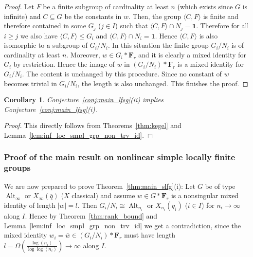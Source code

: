 \documentclass[a4paper,12pt]{amsproc}
\newcommand{\norm}[1]{\left\lvert#1\right\rvert}%
\DeclareMathOperator{\Alt}{Alt}%
\theoremstyle{plain}
\newtheorem{corollary}[definition]{Corollary}
\theoremstyle{definition}
\begin{document}
\begin{proof} 
Let $F$ be a finite subgroup of cardinality at least $n$ (which exists since $G$ is infinite) and $C\subseteq G$ be the constants in $w$. Then, the group $\langle C,F\rangle$ is finite and therefore contained in some $G_j$ ($j\in I$) such that $\langle C,F\rangle\cap N_j=\mathbf{1}$. Therefore for all $i \geq j$ we also have $\langle C,F\rangle \leq G_i$ and $\langle C,F\rangle\cap N_i=\mathbf{1}$. Hence $\langle C,F\rangle$ is also isomorphic to a subgroup of $G_i/N_i$. In this situation the finite  group $G_i/N_i$ is of cardinality at least $n$. Moreover, $w \in G_i\ast\mathbf{F}_r$ and it is clearly a mixed identity for $G_i$ by restriction. Hence the image of $w$ in $(G_i/N_i)\ast\mathbf{F}_r$ is a mixed identity for $G_i/N_i.$ The content is unchanged by this procedure. Since no constant of $w$ becomes trivial in $G_i/N_i$, the length is also unchanged. This finishes the proof.
\end{proof}
	
\begin{corollary}\label{cor:loc_fin_smpl_grp_no_id}
Conjecture~\ref{conj:main_lfsg}(ii) implies Conjecture~\ref{conj:main_lfsg}(i).
\end{corollary}
	
\begin{proof}
This directly follows from Theorems~\ref{thm:kegel} and Lemma~\ref{lem:inf_loc_smpl_grp_non_trv_id}.
\end{proof}

\subsubsection{Proof of the main result on nonlinear simple locally finite groups}

We are now prepared to prove Theorem~\ref{thm:main_slfg}(i): Let $G$ be of type $\Alt_\infty$ or $X_\infty(\overline{q})$ ($X$ classical) and assume $w\in G\ast\mathbf{F}_r$ is a nonsingular mixed identity of length $\norm{w}=l$. Then $G_i/N_i\cong \Alt_{n_i}$ or $X_{n_i}(q_i)$ ($i\in I$) for $n_i\to\infty$ along $I$. Hence by Theorem~\ref{thm:rank_bound} and Lemma~\ref{lem:inf_loc_smpl_grp_non_trv_id} we get a contradiction, since the mixed identity $w_i=\overline{w}\in (G_i/N_i)\ast\mathbf{F}_r$ must have length $l=\Omega\left(\frac{\log(n_i)}{\log\log(n_i)}\right)\to\infty$ along $I$.
\end{document}
